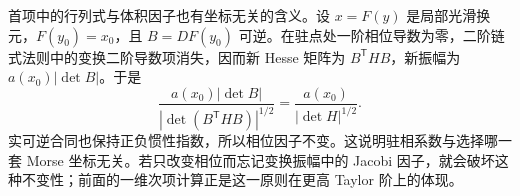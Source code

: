 \ProseParagraphBreak

首项中的行列式与体积因子也有坐标无关的含义。设 \(x=F(y)\) 是局部光滑换元，\(F(y_0)=x_0\)，且 \(B=DF(y_0)\) 可逆。在驻点处一阶相位导数为零，二阶链式法则中的变换二阶导数项消失，因而新 Hesse 矩阵为 \(B^{\mathsf T}HB\)，新振幅为 \(a(x_0)|\det B|\)。于是
\[
 \frac{a(x_0)|\det B|}
 {|\det(B^{\mathsf T}HB)|^{1/2}}
 =\frac{a(x_0)}{|\det H|^{1/2}}.
\]
实可逆合同也保持正负惯性指数，所以相位因子不变。这说明驻相系数与选择哪一套 Morse 坐标无关。若只改变相位而忘记变换振幅中的 Jacobi 因子，就会破坏这种不变性；前面的一维次项计算正是这一原则在更高 Taylor 阶上的体现。

